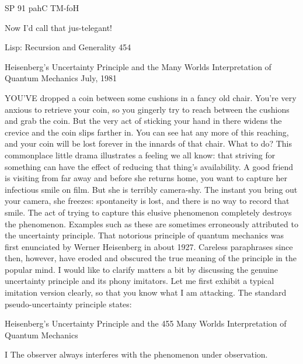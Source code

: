               SP 91 pahC TM-foH

Now I'd call that jus-telegant!




Lisp: Recursion and Generality                                                     454

               Heisenberg's Uncertainty Principle
              and the Many Worlds Interpretation
                    of Quantum Mechanics
                                       July, 1981


YOU’VE dropped a coin between some cushions in a fancy old chair. You're very
anxious to retrieve your coin, so you gingerly try to reach between the cushions and
grab the coin. But the very act of sticking your hand in there widens the crevice and
the coin slips farther in. You can see hat any more of this reaching, and your coin will
be lost forever in the innards of that chair. What to do? This commonplace little
drama illustrates a feeling we all know: that striving for something can have the effect
of reducing that thing's availability.
        A good friend is visiting from far away and before she returns home, you want
to capture her infectious smile on film. But she is terribly camera-shy. The instant you
bring out your camera, she freezes: spontaneity is lost, and there is no way to record
that smile. The act of trying to capture this elusive phenomenon completely destroys
the phenomenon.
        Examples such as these are sometimes erroneously attributed to the
uncertainty principle. That notorious principle of quantum mechanics was first
enunciated by Werner Heisenberg in about 1927. Careless paraphrases since then,
however, have eroded and obscured the true meaning of the principle in the popular
mind. I would like to clarify matters a bit by discussing the genuine uncertainty
principle and its phony imitators.
        Let me first exhibit a typical imitation version clearly, so that you know what I
am attacking. The standard pseudo-uncertainty principle states:




Heisenberg's Uncertainty Principle and the                                           455
Many Worlds Interpretation of Quantum Mechanics

       I
       The observer always interferes with the phenomenon under observation.

